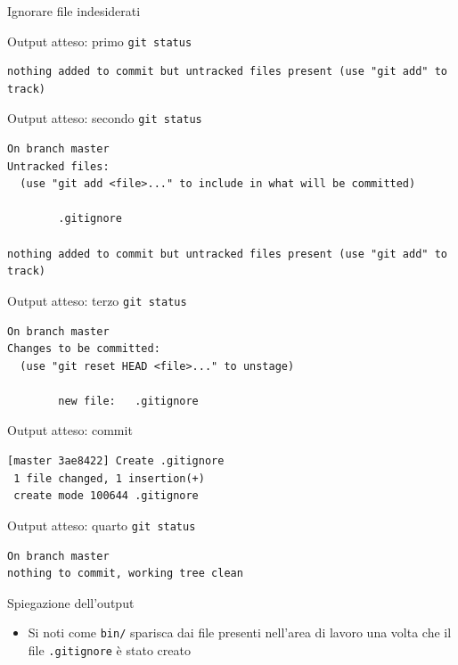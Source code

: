\documentclass[presentation]{beamer}
\begin{document}
\begin{frame}{Ignorare file indesiderati}
\begin{block}{Output atteso: primo \texttt{git status}}
\begin{Verbatim}[fontsize=\scriptsize]
nothing added to commit but untracked files present (use "git add" to track)
		\end{Verbatim}
	\end{block}
	\begin{block}{Output atteso: secondo \texttt{git status}}
		\begin{Verbatim}[fontsize=\scriptsize]
On branch master
Untracked files:
  (use "git add <file>..." to include in what will be committed)

        .gitignore

nothing added to commit but untracked files present (use "git add" to track)
		\end{Verbatim}
	\end{block}
	\begin{block}{Output atteso: terzo \texttt{git status}}
		\begin{Verbatim}[fontsize=\scriptsize]
On branch master
Changes to be committed:
  (use "git reset HEAD <file>..." to unstage)

        new file:   .gitignore

		\end{Verbatim}
	\end{block}
	\begin{block}{Output atteso: commit}
		\begin{Verbatim}[fontsize=\scriptsize]
[master 3ae8422] Create .gitignore
 1 file changed, 1 insertion(+)
 create mode 100644 .gitignore
		\end{Verbatim}
	\end{block}
	\begin{block}{Output atteso: quarto \texttt{git status}}
		\begin{Verbatim}[fontsize=\scriptsize]
On branch master
nothing to commit, working tree clean
		\end{Verbatim}
	\end{block}
	\begin{block}{Spiegazione dell'output}
		\begin{itemize}
			\item Si noti come \texttt{bin/} sparisca dai file presenti nell'area di lavoro una volta che il file \texttt{.gitignore} è stato creato
		\end{itemize}
	\end{block}
\end{frame}
\end{document}

